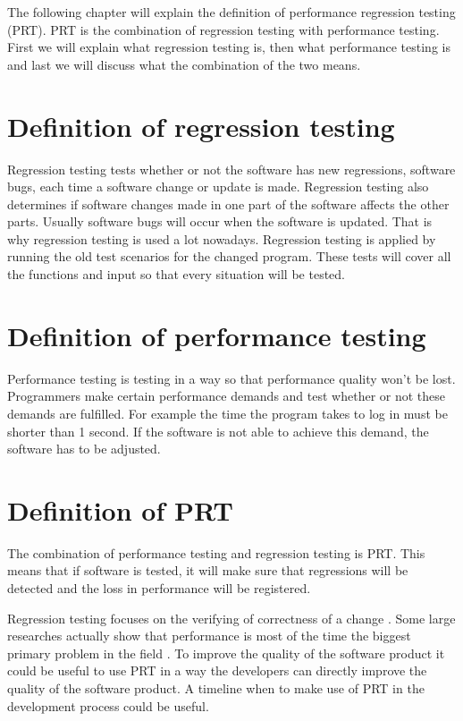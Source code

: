 The following chapter will explain the definition of performance regression testing (PRT). PRT is the combination of regression testing with performance testing. First we will explain what regression testing is, then what performance testing is and last we will discuss what the combination of the two means.

\section{Definition of regression testing}
Regression testing tests whether or not the software has new regressions, software bugs, each time a software change or update is made. Regression testing also determines if software changes made in one part of the software affects the other parts. Usually software bugs will occur when the software is updated. That is why regression testing is used a lot nowadays. Regression testing is applied by running the old test scenarios for the changed program. These tests will cover all the functions and input so that every situation will be tested.

\section{Definition of performance testing}
Performance testing is testing in a way so that performance quality won't be lost. Programmers make certain performance demands and test whether or not these demands are fulfilled. For example the time the program takes to log in must be shorter than 1 second. If the software is not able to achieve this demand, the software has to be adjusted.

\section{Definition of PRT}
The combination of performance testing and regression testing is PRT. This means that if software is tested, it will make sure that regressions will be detected and the loss in performance will be registered.

Regression testing focuses on the verifying of correctness of a change \cite{detection_performance_regressions}. Some large researches actually show that performance is most of the time the biggest primary problem in the field \cite{foo2010mining}. \newline To improve the quality of the software product it could be useful to use PRT in a way the developers can directly improve the quality of the software product. A timeline when to make use of PRT in the development process could be useful.
